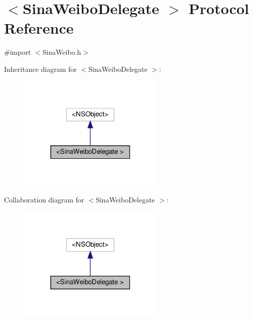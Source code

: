 \hypertarget{protocolSinaWeiboDelegate_01-p}{}\section{$<$Sina\+Weibo\+Delegate $>$ Protocol Reference}
\label{protocolSinaWeiboDelegate_01-p}


{\ttfamily \#import $<$Sina\+Weibo.\+h$>$}



Inheritance diagram for $<$Sina\+Weibo\+Delegate $>$\+:
\nopagebreak
\begin{figure}[H]
\begin{center}
\leavevmode
\includegraphics[width=198pt]{protocolSinaWeiboDelegate_01-p__inherit__graph}
\end{center}
\end{figure}


Collaboration diagram for $<$Sina\+Weibo\+Delegate $>$\+:
\nopagebreak
\begin{figure}[H]
\begin{center}
\leavevmode
\includegraphics[width=198pt]{protocolSinaWeiboDelegate_01-p__coll__graph}
\end{center}
\end{figure}
